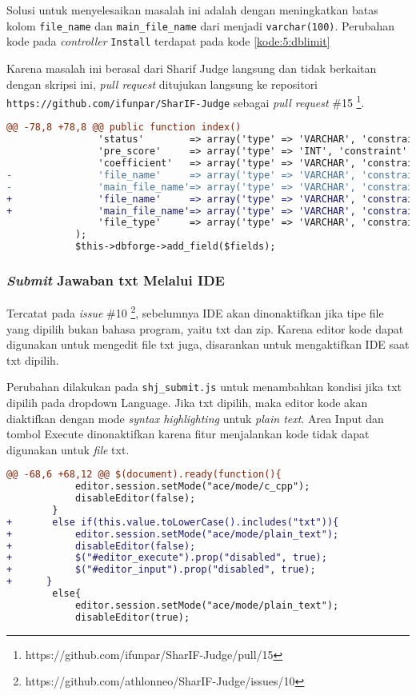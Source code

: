 Solusi untuk menyelesaikan masalah ini adalah dengan meningkatkan batas kolom \verb|file_name| dan \verb|main_file_name| dari menjadi \verb|varchar(100)|. Perubahan kode pada \textit{controller} \verb|Install| terdapat pada kode \ref{kode:5:dblimit}

Karena masalah ini berasal dari Sharif Judge langsung dan tidak berkaitan dengan skripsi ini, \textit{pull request} ditujukan langsung ke repositori \verb|https://github.com/ifunpar/SharIF-Judge| sebagai \textit{pull request} \#15 \footnote{https://github.com/ifunpar/SharIF-Judge/pull/15}.

\begin{lstlisting}[language=diff, caption=Perubahan pada \texttt{Install.php}, label=kode:5:dblimit]
@@ -78,8 +78,8 @@ public function index()
				'status'        => array('type' => 'VARCHAR', 'constraint' => 100),
				'pre_score'     => array('type' => 'INT', 'constraint' => 11),
				'coefficient'   => array('type' => 'VARCHAR', 'constraint' => 6),
-				'file_name'     => array('type' => 'VARCHAR', 'constraint' => 30),
-				'main_file_name'=> array('type' => 'VARCHAR', 'constraint' => 30),
+				'file_name'     => array('type' => 'VARCHAR', 'constraint' => 100),
+				'main_file_name'=> array('type' => 'VARCHAR', 'constraint' => 100),
				'file_type'     => array('type' => 'VARCHAR', 'constraint' => 6),
			);
			$this->dbforge->add_field($fields);
\end{lstlisting}

\subsubsection{\textit{Submit} Jawaban txt Melalui IDE}
Tercatat pada \textit{issue} \#10 \footnote{https://github.com/athlonneo/SharIF-Judge/issues/10}, sebelumnya IDE akan dinonaktifkan jika tipe file yang dipilih bukan bahasa program, yaitu txt dan zip. Karena editor kode dapat digunakan untuk mengedit file txt juga, disarankan untuk mengaktifkan IDE saat txt dipilih.

Perubahan dilakukan pada \verb|shj_submit.js| untuk menambahkan kondisi jika txt dipilih pada dropdown Language. Jika txt dipilih, maka editor kode akan diaktifkan dengan mode \textit{syntax highlighting} untuk \textit{plain text}. Area Input dan tombol Execute dinonaktifkan karena fitur menjalankan kode tidak dapat digunakan untuk \textit{file} txt.

\begin{lstlisting}[language=diff, caption=Perubahan pada \texttt{shj\_submit.js}, label=kode:5:uptxt]
@@ -68,6 +68,12 @@ $(document).ready(function(){
            editor.session.setMode("ace/mode/c_cpp");
            disableEditor(false);
        }
+       else if(this.value.toLowerCase().includes("txt")){
+           editor.session.setMode("ace/mode/plain_text");
+           disableEditor(false);
+           $("#editor_execute").prop("disabled", true);
+           $("#editor_input").prop("disabled", true);
+      }
        else{
            editor.session.setMode("ace/mode/plain_text");
            disableEditor(true);
\end{lstlisting}

